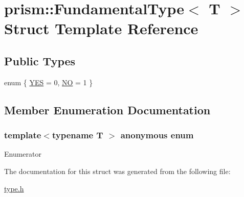 \hypertarget{structprism_1_1_fundamental_type}{}\section{prism\+:\+:Fundamental\+Type$<$ T $>$ Struct Template Reference}
\label{structprism_1_1_fundamental_type}
\subsection*{Public Types}
\begin{DoxyCompactItemize}
\item 
enum \{ \hyperlink{structprism_1_1_fundamental_type_ae83130851d5975bc5ba72692728e62bea1bccfadc5e14003db9a15050c08cb52a}{Y\+ES} = 0, 
\hyperlink{structprism_1_1_fundamental_type_ae83130851d5975bc5ba72692728e62bea8315675cfa73aab6de0691c9ecb697b1}{NO} = 1
 \}
\end{DoxyCompactItemize}


\subsection{Member Enumeration Documentation}
\subsubsection[{\texorpdfstring{anonymous enum}{anonymous enum}}]{\setlength{\rightskip}{0pt plus 5cm}template$<$typename T $>$ anonymous enum}\hypertarget{structprism_1_1_fundamental_type_ae83130851d5975bc5ba72692728e62be}{}\label{structprism_1_1_fundamental_type_ae83130851d5975bc5ba72692728e62be}
\begin{Desc}
\item[Enumerator]\par
\begin{description}
\item[{\em 
Y\+ES\hypertarget{structprism_1_1_fundamental_type_ae83130851d5975bc5ba72692728e62bea1bccfadc5e14003db9a15050c08cb52a}{}\label{structprism_1_1_fundamental_type_ae83130851d5975bc5ba72692728e62bea1bccfadc5e14003db9a15050c08cb52a}
}]\item[{\em 
NO\hypertarget{structprism_1_1_fundamental_type_ae83130851d5975bc5ba72692728e62bea8315675cfa73aab6de0691c9ecb697b1}{}\label{structprism_1_1_fundamental_type_ae83130851d5975bc5ba72692728e62bea8315675cfa73aab6de0691c9ecb697b1}
}]\end{description}
\end{Desc}


The documentation for this struct was generated from the following file\+:\begin{DoxyCompactItemize}
\item 
\hyperlink{type_8h}{type.\+h}\end{DoxyCompactItemize}
